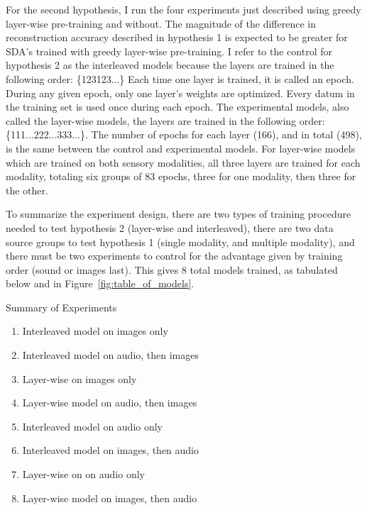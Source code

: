 \documentclass[12pt]{article}
\begin{document}
\begin{doublespacing}
	For the second hypothesis, I run the four experiments just described using greedy layer-wise pre-training and without. The magnitude of the difference in reconstruction accuracy described in hypothesis 1 is expected to be greater for SDA's trained with greedy layer-wise pre-training. I refer to the control for hypothesis 2 as the interleaved models because the layers are trained in the following order: \{123123...\} Each time one layer is trained, it is called an epoch. During any given epoch, only one layer's weights are optimized. Every datum in the training set is used once during each epoch. The experimental models, also called the layer-wise models, the layers are trained in the following order: \{111...222...333...\}. The number of epochs for each layer (166), and in total (498), is the same between the control and experimental models. For layer-wise models which are trained on both sensory modalities, all three layers are trained for each modality, totaling six groups of 83 epochs, three for one modality, then three for the other.
	
		To summarize the experiment design, there are two types of training procedure needed to test hypothesis 2 (layer-wise and interleaved), there are two data source groups to test hypothesis 1 (single modality, and multiple modality), and there must be two experiments to control for the advantage given by training order (sound or images last). This gives 8 total models trained, as tabulated below and in Figure~\ref{fig:table_of_models}. 
	
	Summary of Experiments
\begin{enumerate}
\item Interleaved model on images only
\item Interleaved model on audio, then images
\item Layer-wise on images only
\item Layer-wise model on audio, then images
\item Interleaved model on audio only
\item Interleaved model on images, then audio
\item Layer-wise on  on audio only
\item Layer-wise model on images, then audio
\end{enumerate}
	
	

\end{doublespacing}
\end{document}
